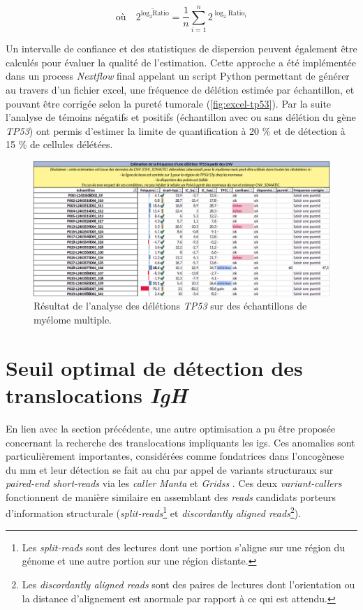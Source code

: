 \begin{equation}
    \text{où} \quad \overline{2^{\log_2\text{Ratio}}} = \frac{1}{n} \sum_{i=1}^{n} 2^{\log_2\text{Ratio}_i}
\end{equation}
    
Un intervalle de confiance et des statistiques de dispersion peuvent également être calculés pour évaluer la qualité de l'estimation. Cette 
approche a été implémentée dans un process \textit{Nextflow} final appelant un script Python permettant de générer au travers d'un fichier excel, 
une fréquence de délétion estimée par échantillon, et pouvant être corrigée selon la pureté tumorale (\autoref{fig:excel-tp53}). 
Par la suite l'analyse de témoins négatifs et positifs (échantillon avec ou sans délétion du gène \textit{TP53}) ont permis d'estimer 
la limite de quantification à 20 \% et de détection à 15 \% de cellules délétées.

\begin{figure}[H]
    \centering
    \includegraphics[width=1\textwidth]{images/excel_tp53.png}
    \caption{Résultat de l'analyse des délétions \textit{TP53} sur des échantillons de myélome multiple.}
    \label{fig:excel-tp53}
\end{figure}

\section{Seuil optimal de détection des translocations \textit{IgH}}

En lien avec la section précédente, une autre optimisation a pu être proposée concernant la recherche des translocations impliquants les \glspl{ig}.
Ces anomalies sont particulièrement importantes, considérées comme fondatrices dans l'oncogènese du \gls{mm} et leur détection se fait au \gls{chu} 
par appel de variants structuraux sur \textit{paired-end short-reads} via les \textit{caller} \textit{Manta} \cite{chenMantaRapidDetection2016a} et 
\textit{Gridss} \cite{cameronGRIDSSSensitiveSpecific2017a}. Ces deux \textit{variant-callers} fonctionnent de manière similaire en assemblant des \textit{reads} candidats
porteurs d'information structurale (\textit{split-reads}\footnote{Les \textit{split-reads} sont des lectures dont une portion s'aligne sur une région du génome 
et une autre portion sur une région distante.} et \textit{discordantly aligned reads}\footnote{Les \textit{discordantly aligned reads} 
sont des paires de lectures dont l'orientation ou la distance d'alignement est anormale par rapport à ce qui est attendu.}).

